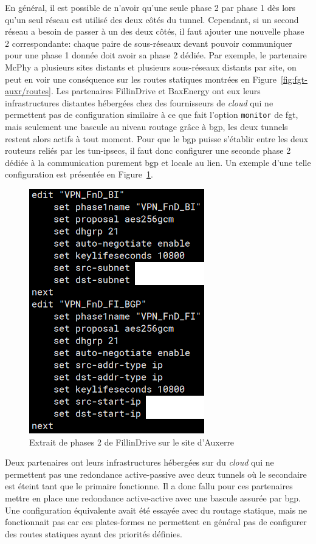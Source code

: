 \documentclass[12pt, oneside, a4paper, titlepage]{report}
\begin{document}
En général, il est possible de n'avoir qu'une seule phase 2 par phase 1 dès lors
qu'un seul réseau est utilisé des deux côtés du tunnel. Cependant, si un second
réseau a besoin de passer à un des deux côtés, il faut ajouter une nouvelle
phase 2 correspondante: chaque paire de sous-réseaux devant pouvoir communiquer
pour une phase 1 donnée doit avoir sa phase 2 dédiée. Par exemple, le partenaire
McPhy a plusieurs sites distants et plusieurs sous-réseaux distants par site, on
peut en voir une conséquence sur les routes statiques montrées en
Figure~\ref{fig:fgt-auxr/routes}. Les partenaires FillinDrive et BaxEnergy ont
eux leurs infrastructures distantes hébergées chez des fournisseurs de
\textit{cloud} qui ne permettent pas de configuration similaire à ce que fait
l'option \texttt{monitor} de \acrlong{fgt}, mais seulement une bascule au niveau
routage grâce à \gls{bgp}, les deux tunnels restent alors actifs à tout moment.
Pour que le \gls{bgp} puisse s'établir entre les deux routeurs reliés par les
\glspl{tun-ipsec}, il faut donc configurer une seconde phase 2 dédiée à la
communication purement \gls{bgp} et locale au lien. Un exemple d'une telle
configuration est présentée en Figure~\ref{fig:fgt-auxr/ipsec-phase2}.

\begin{figure}[h!]
    \centering
    \includegraphics[width = 0.5\linewidth]{img/fgt-auxr/ipsec-phase2.png}
    \caption{Extrait de phases 2 de FillinDrive sur le site d'Auxerre}%
    \label{fig:fgt-auxr/ipsec-phase2}
\end{figure}
\FloatBarrier{}

Deux partenaires ont leurs infrastructures hébergées sur du \textit{cloud} qui
ne permettent pas une redondance active-passive avec deux tunnels où le
secondaire est éteint tant que le primaire fonctionne. Il a donc fallu pour ces
partenaires mettre en place une redondance active-active avec une bascule
assurée par \gls{bgp}. Une configuration équivalente avait été essayée avec du
routage statique, mais ne fonctionnait pas car ces plates-formes ne permettent
en général pas de configurer des routes statiques ayant des priorités définies.
\end{document}
